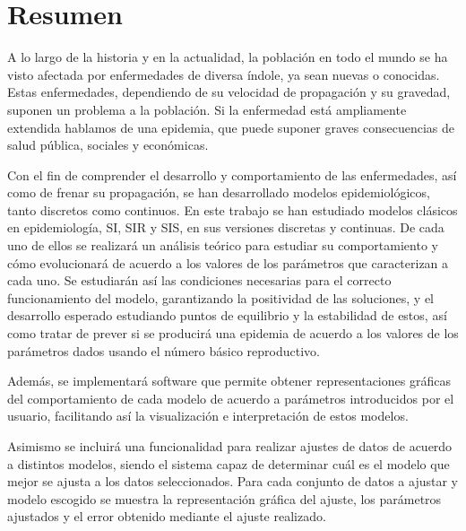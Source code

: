 

\chapter*{Resumen}


A lo largo de la historia y en la actualidad, la población en todo el mundo se ha visto afectada por enfermedades de diversa índole, ya sean nuevas o conocidas. Estas enfermedades, dependiendo de su velocidad de propagación y su gravedad, suponen un problema a la población. Si la enfermedad está ampliamente extendida hablamos de una epidemia, que puede suponer graves consecuencias de salud pública, sociales y económicas.

Con el fin de comprender el desarrollo y comportamiento de las enfermedades, así como de frenar su propagación, se han desarrollado modelos epidemiológicos, tanto discretos como continuos. En este trabajo se han estudiado modelos clásicos en epidemiología, SI, SIR y SIS, en sus versiones discretas y continuas. De cada uno de ellos se realizará un análisis teórico para estudiar su comportamiento y cómo evolucionará de acuerdo a los valores de los parámetros que caracterizan a cada uno. Se estudiarán así las condiciones necesarias para el correcto funcionamiento del modelo, garantizando la positividad de las soluciones, y el desarrollo esperado estudiando puntos de equilibrio y la estabilidad de estos, así como tratar de prever si se producirá una epidemia de acuerdo a los valores de los parámetros dados usando el número básico reproductivo.

Además, se implementará software que permite obtener representaciones gráficas del comportamiento de cada modelo de acuerdo a parámetros introducidos por el usuario, facilitando así la visualización e interpretación de estos modelos.

Asimismo se incluirá una funcionalidad para realizar ajustes de datos de acuerdo a distintos modelos, siendo el sistema capaz de determinar cuál es el modelo que mejor se ajusta a los datos seleccionados. Para cada conjunto de datos a ajustar y modelo escogido se muestra la representación gráfica del ajuste, los parámetros ajustados y el error obtenido mediante el ajuste realizado.

